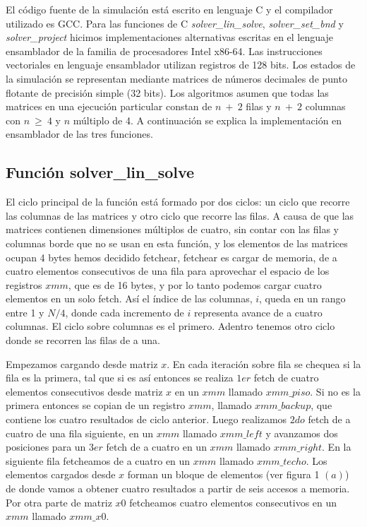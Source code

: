 El código fuente de la simulación está escrito en lenguaje C y el compilador utilizado es GCC. Para las funciones de C \textit{solver\_lin\_solve}, \textit{solver\_set\_bnd} y \textit{solver\_project} hicimos implementaciones alternativas escritas en el lenguaje ensamblador de la familia de procesadores Intel x86-64. Las instrucciones vectoriales en lenguaje ensamblador utilizan registros de 128 bits. Los estados de la simulación se representan mediante matrices de números decimales de punto flotante de precisión simple (32 bits). Los algoritmos asumen que todas las matrices en una ejecución particular constan de $n\ +\ 2$ filas y $n\ +\ 2$ columnas con $n\ \geq\ 4$ y $n$ múltiplo de 4. A continuación se explica la implementación en ensamblador de las tres funciones.
\subsection{Función solver\_lin\_solve}
 El ciclo principal de la función está formado por dos ciclos: un ciclo que recorre las columnas de las matrices y
 otro ciclo que recorre las filas. A causa de que las matrices contienen dimensiones múltiplos de 
 cuatro, sin contar con las filas y columnas borde que no se usan en esta función, y los elementos
 de las matrices ocupan 4 bytes hemos decidido fetchear, fetchear es cargar de memoria, de a cuatro elementos consecutivos
 de una fila para aprovechar el espacio de los registros $xmm$, que es
 de 16 bytes, y por lo tanto podemos cargar cuatro elementos en un solo fetch. Así el índice de
 las columnas, $i$, queda en un rango entre 1 y $N/4$, donde cada incremento de $i$ representa avance de a cuatro columnas. El ciclo sobre columnas es el primero.  
 Adentro tenemos otro ciclo donde se recorren las filas de a una. 

Empezamos cargando desde matriz $x$.
 En cada iteración sobre fila se chequea si la fila es la primera, tal que si es así entonces 
 se realiza $1er$ fetch de cuatro elementos consecutivos desde matriz $x$ en un $xmm$ llamado $xmm\_piso$. Si no es la 
 primera entonces se copian de un registro $xmm$, llamado $xmm\_backup$, que contiene los 
 cuatro resultados de ciclo anterior.
Luego realizamos $2do$ fetch de a cuatro de una fila siguiente, en un $xmm$ llamado
 $xmm\_left$ y avanzamos dos posiciones para un $3er$ fetch de a cuatro en un $xmm$ llamado $xmm\_right$.
 En la siguiente fila fetcheamos de a cuatro en un $xmm$ llamado $xmm\_techo$. Los elementos cargados desde $x$
 forman un bloque de elementos (ver figura 1 $(a)$) de donde vamos a obtener cuatro resultados a partir de seis
 accesos a memoria.
 Por otra parte de matriz $x0$ fetcheamos cuatro elementos consecutivos en un $xmm$ llamado $xmm\_x0$.

